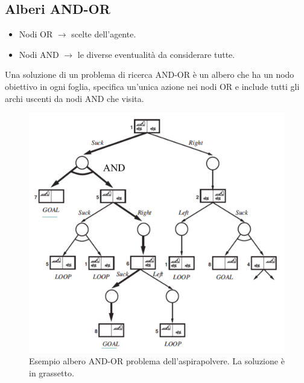 \documentclass{article}
\begin{document}
\subsection{Alberi AND-OR}
\begin{itemize}
    \item Nodi OR $\rightarrow$ scelte dell'agente.
    \item Nodi AND $\rightarrow$ le diverse eventualità da considerare tutte.
\end{itemize}
Una soluzione di un problema di ricerca AND-OR è un albero che ha un nodo obiettivo in ogni foglia, specifica un'unica azione nei nodi OR e include tutti gli archi uscenti da nodi AND che visita.
\begin{figure}[H]
    \centering
    \includegraphics[scale=0.5]{Images/andortree.png}
    \caption{Esempio albero AND-OR problema dell'aspirapolvere. La soluzione è in grassetto.}
\end{figure}















%
%
\end{document}
